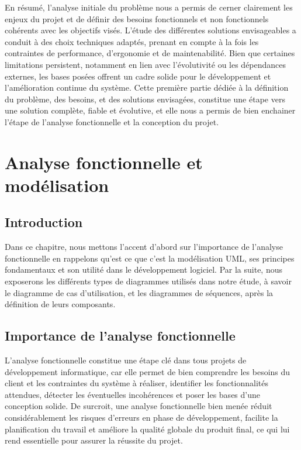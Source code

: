 \documentclass[12pt,a4paper]{report}
\begin{document}
	En résumé, l’analyse initiale du problème nous a permis de cerner clairement les enjeux du projet et de définir des besoins fonctionnels et non fonctionnels cohérents avec les objectifs visés. L’étude des différentes solutions envisageables a conduit à des choix techniques adaptés, prenant en compte à la fois les contraintes de performance, d’ergonomie et de maintenabilité. Bien que certaines limitations persistent, notamment en lien avec l’évolutivité ou les dépendances externes, les bases posées offrent un cadre solide pour le développement et l’amélioration continue du système. Cette première partie dédiée à la définition du problème, des besoins, et des solutions envisagées, constitue une étape vers une solution complète, fiable et évolutive, et elle nous a permis de bien enchainer l'étape de l'analyse fonctionnelle et la conception du projet.
	
	\chapter{Analyse fonctionnelle et modélisation}
	
	\section{Introduction}
	
	Dans ce chapitre, nous mettons l'accent d'abord sur l'importance de l'analyse fonctionnelle en rappelons qu'est ce que c'est la modélisation UML, ses principes fondamentaux et son utilité dans le développement logiciel. Par la suite, nous exposerons les différents types de diagrammes utilisés dans notre étude, à savoir le diagramme de cas d’utilisation, et les diagrammes de séquences, après la définition de leurs composants.
	
	\section{Importance de l'analyse fonctionnelle}
	
	L’analyse fonctionnelle constitue une étape clé dans tous projets de développement informatique, car elle permet de bien comprendre les besoins du client et les contraintes du système à réaliser, identifier les fonctionnalités attendues, détecter les éventuelles incohérences et poser les bases d’une conception solide. De surcroit, une analyse fonctionnelle bien menée réduit considérablement les risques d’erreurs en phase de développement, facilite la planification du travail et améliore la qualité globale du produit final, ce qui lui rend essentielle pour assurer la réussite du projet.
	
\end{document}
